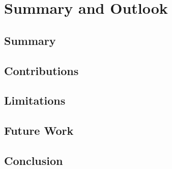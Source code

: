 \chapter{Summary and Outlook}
\label{ch:conclusion}

\section{Summary}
\label{sec:summary}


\section{Contributions}
\label{sec:contributions}


\section{Limitations}
\label{sec:conclusion-limitations}


\section{Future Work}
\label{sec:future-work}


\section{Conclusion}
\label{sec:final-conclusion}

